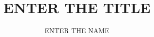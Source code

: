\documentclass[A4]{textbook}
\title{ENTER THE TITLE}
\author{ENTER THE NAME}
\begin{document}
\maketitle%

\tableofcontents


%


\nocite{*} 
\printbibliography
\end{document}
